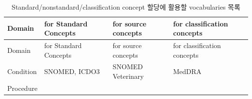 \documentclass[11pt]{book}
\theoremstyle{definition}
\theoremstyle{definition}
\theoremstyle{definition}
\theoremstyle{remark}
\begin{document}
\begin{longtable}[]{@{}llll@{}}
\caption{\label{tab:vocabList} Standard/nonstandard/classification concept
할당에 활용할 vocabularies 목록}\tabularnewline
\toprule
\begin{minipage}[b]{0.12\columnwidth}\raggedright\strut
Domain\strut
\end{minipage} & \begin{minipage}[b]{0.21\columnwidth}\raggedright\strut
for Standard Concepts\strut
\end{minipage} & \begin{minipage}[b]{0.21\columnwidth}\raggedright\strut
for source concepts\strut
\end{minipage} & \begin{minipage}[b]{0.18\columnwidth}\raggedright\strut
for classification concepts\strut
\end{minipage}\tabularnewline
\midrule
\endfirsthead
\toprule
\begin{minipage}[b]{0.12\columnwidth}\raggedright\strut
Domain\strut
\end{minipage} & \begin{minipage}[b]{0.21\columnwidth}\raggedright\strut
for Standard Concepts\strut
\end{minipage} & \begin{minipage}[b]{0.21\columnwidth}\raggedright\strut
for source concepts\strut
\end{minipage} & \begin{minipage}[b]{0.18\columnwidth}\raggedright\strut
for classification concepts\strut
\end{minipage}\tabularnewline
\midrule
\endhead
\begin{minipage}[t]{0.12\columnwidth}\raggedright\strut
Condition\strut
\end{minipage} & \begin{minipage}[t]{0.21\columnwidth}\raggedright\strut
SNOMED, ICDO3\strut
\end{minipage} & \begin{minipage}[t]{0.21\columnwidth}\raggedright\strut
SNOMED Veterinary\strut
\end{minipage} & \begin{minipage}[t]{0.18\columnwidth}\raggedright\strut
MedDRA\strut
\end{minipage}\tabularnewline
\begin{minipage}[t]{0.12\columnwidth}\raggedright\strut
Procedure\strut
\end{minipage} & \begin{minipage}[t]{0.21\columnwidth}\raggedright\strut

\end{minipage}
\end{longtable}
\end{document}
